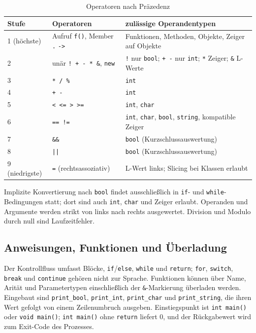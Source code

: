 \documentclass[11pt,a4paper,parskip=half,headsepline,toc=flat]{scrartcl}
\newcommand{\code}[1]{\texttt{#1}}
\newcommand{\thead}{\rowcolor{headbg}}
\newcommand{\hcell}[1]{\textbf{\color{navy}#1}}
\newenvironment{reporttable}[1][]%
  {\begin{table}[htbp]\centering\small\renewcommand{\arraystretch}{1.25}\rowcolors{2}{white}{zebra}}%
  {\end{table}}
\begin{document}
\begin{reporttable}
\begin{tabular}{L{0.16}L{0.28}L{0.48}}
\thead \hcell{Stufe} & \hcell{Operatoren} & \hcell{zulässige Operandentypen} \\  (höchste) & Aufruf \code{f()}, Member \code{.} \code{->} & Funktionen, Methoden, Objekte, Zeiger auf Objekte \\
2 & unär \code{! + - * \&}, \code{new} & \code{!} nur \code{bool}; \code{+ -} nur \code{int}; \code{*} Zeiger; \code{\&} L-Werte \\
3 & \code{* / \%} & \code{int} \\
4 & \code{+ -} & \code{int} \\
5 & \code{< <= > >=} & \code{int}, \code{char} \\
6 & \code{== !=} & \code{int}, \code{char}, \code{bool}, \code{string}, kompatible Zeiger \\
7 & \code{\&\&} & \code{bool} (Kurzschlussauswertung) \\
8 & \code{||} & \code{bool} (Kurzschlussauswertung) \\
9 (niedrigste) & \code{=} (rechtsassoziativ) & L-Wert links; Slicing bei Klassen erlaubt \\ \bottomrule
\end{tabular}
\caption{Operatoren nach Präzedenz}
\end{reporttable}

Implizite Konvertierung nach \code{bool} findet ausschließlich in \code{if}- und \code{while}-Bedingungen statt; dort
sind auch \code{int}, \code{char} und Zeiger erlaubt. Operanden und Argumente werden strikt von links nach rechts
ausgewertet. Division und Modulo durch null sind Laufzeitfehler.

\subsection{Anweisungen, Funktionen und Überladung}
Der Kontrollfluss umfasst Blöcke, \code{if}/\code{else}, \code{while} und \code{return}; \code{for}, \code{switch},
\code{break} und \code{continue} gehören nicht zur Sprache. Funktionen können über Name, Arität und Parametertypen
einschließlich der \code{\&}-Markierung überladen werden. Eingebaut sind \code{print\_bool}, \code{print\_int},
\code{print\_char} und \code{print\_string}, die ihren Wert gefolgt von einem Zeilenumbruch ausgeben. Einstiegspunkt
ist \code{int main()} oder \code{void main()}; \code{int main()} ohne \code{return} liefert 0, und der Rückgabewert
wird zum Exit-Code des Prozesses.
\end{document}
